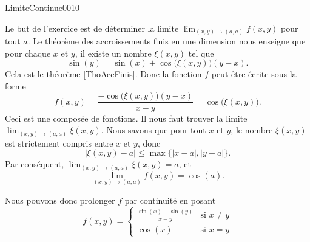 \begin{corrige}{LimiteContinue0010}


Le but de l'exercice est de déterminer la limite $\lim_{(x,y)\to(a,a)}f(x,y)$ pour tout $a$. Le théorème des accroissements finis en une dimension nous enseigne que pour chaque $x$ et $y$, il existe un nombre $\xi(x,y)$ tel que
\begin{equation}
	\sin(y)=\sin(x)+\cos\big( \xi(x,y) \big)(y-x).
\end{equation}
Cela est le théorème \ref{ThoAccFinis}. Donc la fonction $f$ peut être écrite sous la forme
\begin{equation}
	f(x,y)=\frac{ -\cos\big( \xi(x,y) \big)(y-x) }{ x-y }=\cos\big( \xi(x,y) \big).
\end{equation}
Ceci est une composée de fonctions. Il nous faut trouver la limite $\lim_{(x,y)\to(a,a)}\xi(x,y)$. Nous savons que pour tout $x$ et $y$, le nombre $\xi(x,y)$ est strictement compris entre $x$ et $y$, donc
\begin{equation}
	\big| \xi(x,y)-a \big|\leq\max\big\{ | x-a |,| y-a | \big\}.
\end{equation}
Par conséquent, $\lim_{(x,y)\to(a,a)}\xi(x,y)=a$, et
\begin{equation}
	\lim_{(x,y)\to(a,a)}f(x,y)=\cos(a).
\end{equation}

Nous pouvons donc prolonger $f$ par continuité en posant
\begin{equation}
	f(x,y)=\begin{cases}
        \displaystyle\frac{ \sin(x)-\sin(y) }{ x-y }	&	\text{si }x\neq y\\
		\cos(x)	&	 \text{si }x=y
	\end{cases}
\end{equation}

\end{corrige}
